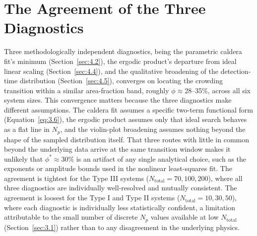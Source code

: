 \section{The Agreement of the Three Diagnostics}
\label{sec:4.7}

Three methodologically independent diagnostics, being the parametric caldera fit's minimum (Section~\ref{sec:4.2}), the ergodic product's departure from ideal linear scaling (Section~\ref{sec:4.4}), and the qualitative broadening of the detection-time distribution (Section~\ref{sec:4.5}), converges on locating the crowding transition within a similar area-fraction band, roughly $\phi \approx 28$--35\%, across all six system sizes. This convergence matters because the three diagnostics make different assumptions. The caldera fit assumes a specific two-term functional form (Equation~\ref{eq:3.6}), the ergodic product assumes only that ideal search behaves as a flat line in $N_p$, and the violin-plot broadening assumes nothing beyond the shape of the sampled distribution itself. That three routes with little in common beyond the underlying data arrive at the same transition window makes it unlikely that $\phi^* \approx 30\%$ is an artifact of any single analytical choice, such as the exponents or amplitude bounds used in the nonlinear least-squares fit. The agreement is tightest for the Type III systems ($N_\text{total} = 70,100,200$), where all three diagnostics are individually well-resolved and mutually consistent. The agreement is loosest for the Type I and Type II systems ($N_\text{total}= 10, 30, 50$), where each diagnostic is individually less statistically confident, a limitation attributable to the small number of discrete $N_p$ values available at low $N_\text{total}$ (Section~\ref{sec:3.1}) rather than to any disagreement in the underlying physics.

